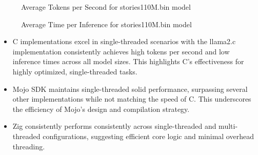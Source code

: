 \documentclass[sigconf]{acmart}
\begin{document}
\begin{figure}[htbp]
  \centering
  \caption{Average Tokens per Second for stories110M.bin model}
\end{figure}

\begin{figure}[htbp]
  \centering
  \caption{Average Time per Inference for stories110M.bin model}
\end{figure}

\begin{itemize}

\item C implementations excel in single-threaded scenarios with the llama2.c implementation consistently achieves high tokens per second and low inference times across all model sizes. This highlights C's effectiveness for highly optimized, single-threaded tasks.

\item Mojo SDK maintains single-threaded solid performance, surpassing several other implementations while not matching the speed of C. This underscores the efficiency of Mojo's design and compilation strategy.

\item Zig consistently performs consistently across single-threaded and multi-threaded configurations, suggesting efficient core logic and minimal overhead threading.

\end{itemize}
\end{document}
